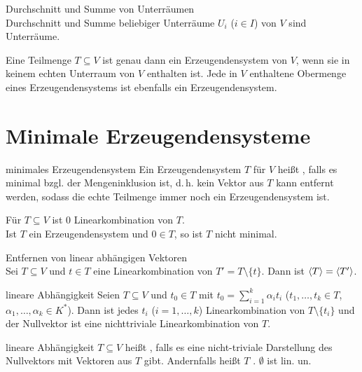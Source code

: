 \begin{Lemma}{Durchschnitt und Summe von Unterräumen} \\
    Durchschnitt und Summe beliebiger Unterräume $U_i$
    ($i \in I$) von $V$ sind Unterräume.
\end{Lemma}

\begin{Kor}
    Eine Teilmenge $T \subseteq V$ ist genau dann ein Erzeugendensystem von
    $V$, wenn sie in keinem echten Unterraum von $V$ enthalten ist.
    Jede in $V$ enthaltene Obermenge eines Erzeugendensystems ist ebenfalls
    ein Erzeugendensystem.
\end{Kor}

\section{%
    Minimale Erzeugendensysteme%
}

\begin{Def}{minimales Erzeugendensystem}
    Ein Erzeugendensystem $T$ für $V$ heißt , falls es minimal
    bzgl. der Mengeninklusion ist, d.\,h. kein Vektor aus $T$ kann entfernt
    werden, sodass die echte Teilmenge immer noch ein Erzeugendensystem ist.
\end{Def}

\begin{Beobachtung}
    Für $T \subseteq V$ ist $0$ Linearkombination von $T$. \\
    Ist $T$ ein Erzeugendensystem und $0 \in T$, so ist $T$ nicht minimal.
\end{Beobachtung}

\begin{Lemma}{Entfernen von linear abhängigen Vektoren} \\
    Sei $T \subseteq V$ und $t \in T$ eine Linearkombination von
    $T' = T \setminus \{t\}$. Dann ist $\langle T \rangle = \langle T' \rangle$.
\end{Lemma}

\begin{Lemma}{lineare Abhängigkeit}
    Seien $T \subseteq V$ und $t_0 \in T$ mit
    $t_0 = \sum_{i=1}^k \alpha_i t_i$ ($t_1, \ldots, t_k \in T$,
    $\alpha_1, \ldots, \alpha_k \in K^\ast$).
    Dann ist jedes $t_i$ ($i = 1, \ldots, k$) Linearkombination von
    $T \setminus \{t_i\}$ und der Nullvektor ist eine nichttriviale
    Linearkombination von $T$.
\end{Lemma}

\begin{Def}{lineare Abhängigkeit}
    $T \subseteq V$ heißt , falls es eine nicht-triviale
    Darstellung des Nullvektors mit Vektoren aus $T$ gibt.
    Andernfalls heißt $T$ .
    $\emptyset$ ist lin. un.
\end{Def}

